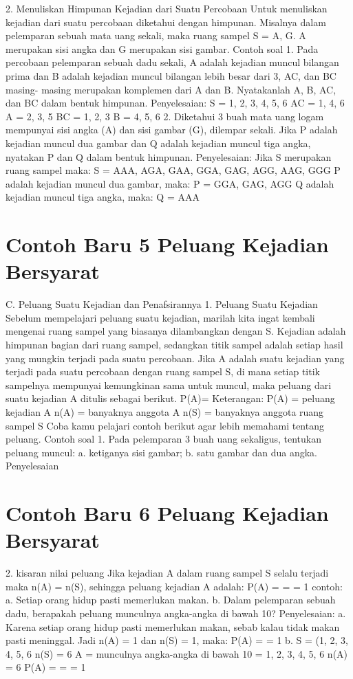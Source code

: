 \documentclass[11pt,fleqn]{book} %
\begin{document}
{{2. Menuliskan Himpunan Kejadian dari Suatu Percobaan
Untuk menuliskan kejadian dari suatu percobaan diketahui dengan himpunan. Misalnya dalam pelemparan sebuah mata uang sekali, maka ruang sampel S = {A, G}. A merupakan sisi angka dan G merupakan sisi gambar.
Contoh soal
1. Pada percobaan pelemparan sebuah dadu sekali, A adalah kejadian muncul bilangan prima dan B adalah kejadian muncul bilangan lebih besar dari 3, AC, dan BC masing-  masing merupakan komplemen dari A dan B. Nyatakanlah A, B, AC, dan BC dalam bentuk himpunan.
Penyelesaian:
S = {1, 2, 3, 4, 5, 6} AC = {1, 4, 6}
A = {2, 3, 5} BC = {1, 2, 3}
B = {4, 5, 6}
2. Diketahui 3 buah mata uang logam mempunyai sisi angka (A) dan sisi gambar (G), dilempar sekali. Jika P adalah kejadian muncul dua gambar dan Q adalah kejadian
muncul tiga angka, nyatakan P dan Q dalam bentuk himpunan.
Penyelesaian:
Jika S merupakan ruang sampel maka:
S = {AAA, AGA, GAA, GGA, GAG, AGG, AAG, GGG}
P adalah kejadian muncul dua gambar, maka:
P = {GGA, GAG, AGG}
Q adalah kejadian muncul tiga angka, maka:
Q = {AAA}



\section{Contoh Baru 5 Peluang Kejadian Bersyarat}

C. Peluang Suatu Kejadian dan Penafsirannya
1. Peluang Suatu Kejadian
Sebelum mempelajari peluang suatu kejadian, marilah kita ingat kembali mengenai ruang sampel yang biasanya dilambangkan dengan S. Kejadian adalah himpunan bagian dari ruang sampel, sedangkan titik sampel adalah setiap hasil yang mungkin terjadi pada suatu percobaan. Jika A adalah suatu kejadian yang terjadi pada suatu percobaan dengan ruang sampel S, di mana setiap titik sampelnya mempunyai kemungkinan sama untuk muncul, maka peluang dari suatu kejadian A ditulis sebagai berikut.
P(A)= 
Keterangan: 	P(A) = peluang kejadian A
n(A) = banyaknya anggota A
n(S) = banyaknya anggota ruang sampel S
Coba kamu pelajari contoh berikut agar lebih memahami tentang peluang.
Contoh soal
1. Pada pelemparan 3 buah uang sekaligus, tentukan peluang muncul:
a. ketiganya sisi gambar;
b. satu gambar dan dua angka.
Penyelesaian


\section{Contoh Baru 6 Peluang Kejadian Bersyarat}


2. kisaran nilai peluang
Jika kejadian A dalam ruang sampel S selalu terjadi maka n(A) = n(S), sehingga
peluang kejadian A adalah: P(A) =  =  = 1
contoh:
a. Setiap orang hidup pasti memerlukan makan.
b. Dalam pelemparan sebuah dadu, berapakah peluang munculnya angka-angka di
bawah 10?
Penyelesaian:
a. Karena setiap orang hidup pasti memerlukan makan, sebab kalau tidak makan
pasti meninggal.
Jadi n(A) = 1 dan n(S) = 1, maka:
P(A) =  = 1
b. S = {(1, 2, 3, 4, 5, 6}  n(S) = 6
A = munculnya angka-angka di bawah 10
= {1, 2, 3, 4, 5, 6}  n(A) = 6
P(A) =  =  = 1

}}
\end{document}
